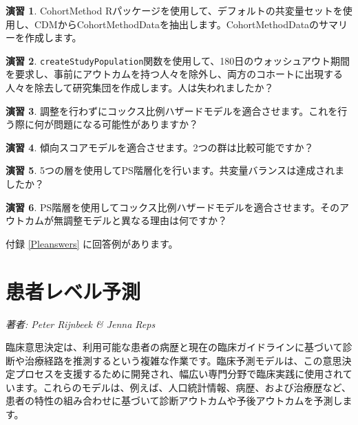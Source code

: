 \documentclass[
  11pt]{book}
\theoremstyle{definition}
\theoremstyle{definition}
\theoremstyle{definition}
\newtheorem{exercise}{演習}[chapter]
\theoremstyle{definition}
\theoremstyle{remark}
\begin{document}
\begin{exercise}
\protect\hypertarget{exr:exercisePle1}{}\label{exr:exercisePle1}CohortMethod Rパッケージを使用して、デフォルトの共変量セットを使用し、CDMからCohortMethodDataを抽出します。CohortMethodDataのサマリーを作成します。
\end{exercise}

\begin{exercise}
\protect\hypertarget{exr:exercisePle2}{}\label{exr:exercisePle2}\texttt{createStudyPopulation}関数を使用して、180日のウォッシュアウト期間を要求し、事前にアウトカムを持つ人々を除外し、両方のコホートに出現する人々を除去して研究集団を作成します。人は失われましたか？
\end{exercise}

\begin{exercise}
\protect\hypertarget{exr:exercisePle3}{}\label{exr:exercisePle3}調整を行わずにコックス比例ハザードモデルを適合させます。これを行う際に何が問題になる可能性がありますか？
\end{exercise}

\begin{exercise}
\protect\hypertarget{exr:exercisePle4}{}\label{exr:exercisePle4}傾向スコアモデルを適合させます。2つの群は比較可能ですか？
\end{exercise}

\begin{exercise}
\protect\hypertarget{exr:exercisePle5}{}\label{exr:exercisePle5}5つの層を使用してPS階層化を行います。共変量バランスは達成されましたか？
\end{exercise}

\begin{exercise}
\protect\hypertarget{exr:exercisePle6}{}\label{exr:exercisePle6}PS階層を使用してコックス比例ハザードモデルを適合させます。そのアウトカムが無調整モデルと異なる理由は何ですか？
\end{exercise}

付録 \ref{Pleanswers} に回答例があります。

\chapter{患者レベル予測}\label{PatientLevelPrediction}

\emph{著者: Peter Rijnbeek \& Jenna Reps}


臨床意思決定は、利用可能な患者の病歴と現在の臨床ガイドラインに基づいて診断や治療経路を推測するという複雑な作業です。臨床予測モデルは、この意思決定プロセスを支援するために開発され、幅広い専門分野で臨床実践に使用されています。これらのモデルは、例えば、人口統計情報、病歴、および治療歴など、患者の特性の組み合わせに基づいて診断アウトカムや予後アウトカムを予測します。   
\end{document}
